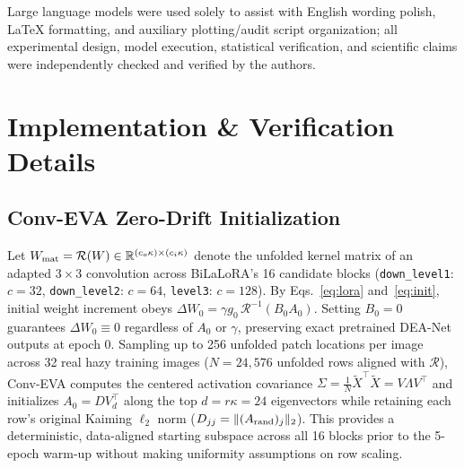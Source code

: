\documentclass[10pt,twocolumn,letterpaper]{article}
\begin{document}
Large language models were used solely to assist with English wording polish, LaTeX formatting, and auxiliary plotting/audit script organization; all experimental design, model execution, statistical verification, and scientific claims were independently checked and verified by the authors.

\FloatBarrier
{\small{}}

\clearpage
\onecolumn
\appendix
{}
\setcounter{table}{0}
\setcounter{figure}{0}

\section{Implementation \& Verification Details}
\subsection{Conv-EVA Zero-Drift Initialization}
Let $W_{\rm mat}=\mathcal{R}(W)\in\mathbb{R}^{(c_o\kappa)\times(c_i\kappa)}$ denote the unfolded kernel matrix of an adapted $3\times 3$ convolution across BiLaLoRA's 16 candidate blocks (\texttt{down\_level1}: $c=32$, \texttt{down\_level2}: $c=64$, \texttt{level3}: $c=128$). By Eqs.~\eqref{eq:lora} and~\eqref{eq:init}, initial weight increment obeys $\Delta W_0=\gamma g_0\,\mathcal{R}^{-1}(B_0 A_0)$. Setting $B_0=0$ guarantees $\Delta W_0\equiv 0$ regardless of $A_0$ or $\gamma$, preserving exact pretrained DEA-Net outputs at epoch 0. Sampling up to 256 unfolded patch locations per image across 32 real hazy training images ($N=24{,}576$ unfolded rows aligned with $\mathcal{R}$), Conv-EVA computes the centered activation covariance $\Sigma=\frac{1}{N}\tilde{X}^\top\tilde{X}=V\Lambda V^\top$ and initializes $A_0=DV_d^\top$ along the top $d=r\kappa=24$ eigenvectors while retaining each row's original Kaiming $\ell_2$ norm ($D_{jj}=\|(A_{\rm rand})_j\|_2$). This provides a deterministic, data-aligned starting subspace across all 16 blocks prior to the 5-epoch warm-up without making uniformity assumptions on row scaling.
\end{document}
